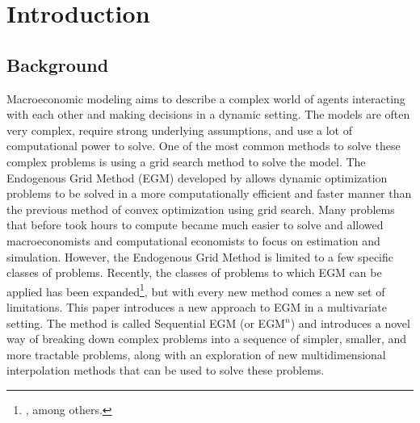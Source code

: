 \documentclass[\econtexRoot/SequentialEGM]{subfiles}
\begin{document}
\hypertarget{introduction}{}
\par\section{Introduction}
\notinsubfile{\label{sec:intro}}
\setcounter{page}{0}

\subsection{Background} %



Macroeconomic modeling aims to describe a complex world of agents interacting with each other and making decisions in a dynamic setting. The models are often very complex, require strong underlying assumptions, and use a lot of computational power to solve. One of the most common methods to solve these complex problems is using a grid search method to solve the model. The Endogenous Grid Method (EGM) developed by \cite{Carroll2006-wq} allows dynamic optimization problems to be solved in a more computationally efficient and faster manner than the previous method of convex optimization using grid search. Many problems that before took hours to compute became much easier to solve and allowed macroeconomists and computational economists to focus on estimation and simulation.
However, the Endogenous Grid Method is limited to a few specific classes of problems. Recently, the classes of problems to which EGM can be applied has been expanded\footnote{\cite{Barillas2007-uh, Maliar2013-sv, Fella2014-my, White2015-fg, Iskhakov2017-my}, among others.}, but with every new method comes a new set of limitations.
This paper introduces a new approach to EGM in a multivariate setting. The method is called Sequential EGM (or EGM$^n$) and introduces a novel way of breaking down complex problems into a sequence of simpler, smaller, and more tractable problems, along with an exploration of new multidimensional interpolation methods that can be used to solve these problems.
\end{document}
